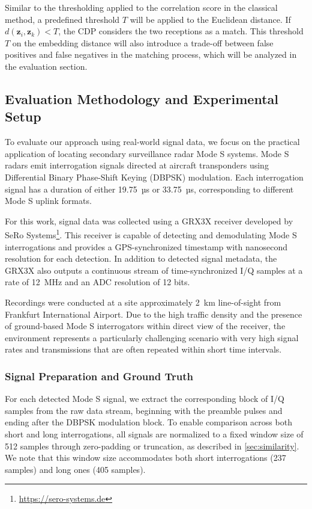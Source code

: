 \documentclass[sigconf, 10pt, nonacm, anonymous]{acmart}  %
\begin{document}
Similar to the thresholding applied to the correlation score in the classical method, a predefined threshold $T$ will be applied to the Euclidean distance. If $d(\mathbf{z}_i, \mathbf{z}_k) < T$, the CDP considers the two receptions as a match. This threshold $T$ on the embedding distance will also introduce a trade-off between false positives and false negatives in the matching process, which will be analyzed in the evaluation section.
\subsection{Evaluation Methodology and Experimental Setup}

To evaluate our approach using real-world signal data, we focus on the practical application of locating secondary surveillance radar Mode S systems. Mode S radars emit interrogation signals directed at aircraft transponders using Differential Binary Phase-Shift Keying (DBPSK) modulation. Each interrogation signal has a duration of either 19.75~µs or 33.75~µs, corresponding to different Mode S uplink formats.

For this work, signal data was collected using a GRX3X receiver developed by SeRo Systems\footnote{\url{https://sero-systems.de}}. This receiver is capable of detecting and demodulating Mode S interrogations and provides a GPS-synchronized timestamp with nanosecond resolution for each detection. In addition to detected signal metadata, the GRX3X also outputs a continuous stream of time-synchronized I/Q samples at a rate of 12~MHz and an ADC resolution of 12 bits.

Recordings were conducted at a site approximately 2~km line-of-sight from Frankfurt International Airport. Due to the high traffic density and the presence of ground-based Mode S interrogators within direct view of the receiver, the environment represents a particularly challenging scenario with very high signal rates and transmissions that are often repeated within short time intervals.

\subsubsection{Signal Preparation and Ground Truth}

For each detected Mode S signal, we extract the corresponding block of I/Q samples from the raw data stream, beginning with the preamble pulses and ending after the DBPSK modulation block. To enable comparison across both short and long interrogations, all signals are normalized to a fixed window size of 512 samples through zero-padding or truncation, as described in \autoref{sec:similarity}. We note that this window size accommodates both short interrogations (237 samples) and long ones (405 samples).
\end{document}
